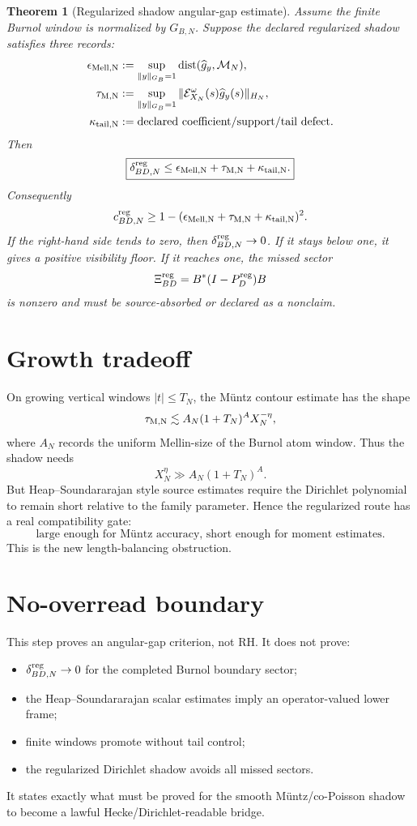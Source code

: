 \documentclass[11pt]{article}
\newtheorem{theorem}{Theorem}
\begin{document}
\begin{theorem}[Regularized shadow angular-gap estimate]
Assume the finite Burnol window is normalized by \(G_{B,N}\). Suppose the declared regularized shadow satisfies three records:
\begin{align*}
  \epsilon_{\rm Mell,N} &:=\sup_{\|y\|_{G_B}=1}\operatorname{dist}(\widehat g_y,\mathcal M_N),\\
  \tau_{\rm M,N} &:=\sup_{\|y\|_{G_B}=1}\|\mathcal E_{X_N}^{\omega}(s)\widehat g_y(s)\|_{H_N},\\
  \kappa_{\rm tail,N} &:=\text{declared coefficient/support/tail defect}.
\end{align*}
Then
\[
  \boxed{
  \delta_{BD,N}^{\rm reg}
  \le
  \epsilon_{\rm Mell,N}+\tau_{\rm M,N}+\kappa_{\rm tail,N}.
  }
\]
Consequently
\[
  c_{BD,N}^{\rm reg}
  \ge
  1-(\epsilon_{\rm Mell,N}+\tau_{\rm M,N}+\kappa_{\rm tail,N})^2.
\]
If the right-hand side tends to zero, then \(\delta_{BD,N}^{\rm reg}\to0\).  If it stays below one, it gives a positive visibility floor.  If it reaches one, the missed sector
\[
  \Xi_{BD}^{\rm reg}=B^*(I-P_D^{\rm reg})B
\]
is nonzero and must be source-absorbed or declared as a nonclaim.
\end{theorem}

\section{Growth tradeoff}
On growing vertical windows \(|t|\le T_N\), the M\"untz contour estimate has the shape
\[
  \tau_{\rm M,N}
  \lesssim
  A_N(1+T_N)^A X_N^{-\eta},
\]
where \(A_N\) records the uniform Mellin-size of the Burnol atom window.  Thus the shadow needs
\[
  X_N^\eta \gg A_N(1+T_N)^A.
\]
But Heap--Soundararajan style source estimates require the Dirichlet polynomial to remain short relative to the family parameter.  Hence the regularized route has a real compatibility gate:
\[
  \boxed{
  \text{large enough for M\"untz accuracy, short enough for moment estimates.}
  }
\]
This is the new length-balancing obstruction.

\section{No-overread boundary}
This step proves an angular-gap criterion, not RH.  It does not prove:
\begin{itemize}
  \item \(\delta_{BD,N}^{\rm reg}\to0\) for the completed Burnol boundary sector;
  \item the Heap--Soundararajan scalar estimates imply an operator-valued lower frame;
  \item finite windows promote without tail control;
  \item the regularized Dirichlet shadow avoids all missed sectors.
\end{itemize}
It states exactly what must be proved for the smooth M\"untz/co-Poisson shadow to become a lawful Hecke/Dirichlet-readable bridge.
\end{document}
